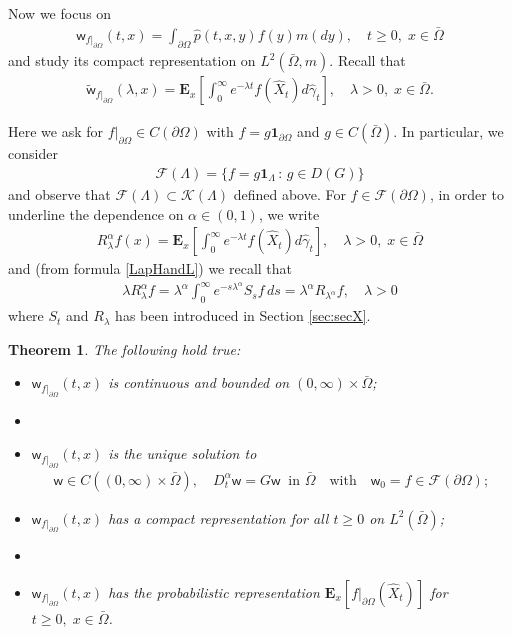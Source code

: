 \documentclass[11pt,a4paper]{article}
\newtheorem{theorem}{Theorem}[section]
\begin{document}
Now we focus on 
\begin{align*}
\mathsf{w}_{f|_{\partial \Omega}}(t, x) = \int_{\partial \Omega} \hat{p}(t,x,y) f(y) m(dy), \quad t\geq 0,\; x \in \bar{\Omega}
\end{align*}
and study its compact representation on $L^2(\bar{\Omega}, m)$. Recall that 
\begin{align*}
\tilde{\mathsf{w}}_{f|_{\partial \Omega}}(\lambda, x) = \mathbf{E}_x\left[\int_0^\infty e^{-\lambda t} f(\hat{X}_t) d\hat{\gamma}_t \right], \quad \lambda > 0, \; x \in \bar{\Omega}.
\end{align*}


Here we ask for $f|_{\partial \Omega} \in C(\partial \Omega)$ with $f=g\mathbf{1}_{\partial \Omega}$ and $g \in C(\bar{\Omega})$. In particular, we consider
\begin{align*}
\mathcal{F}(\Lambda) = \{f = g \mathbf{1}_{\Lambda}\, :\,  g \in D(G)\}
\end{align*} 
and observe that $\mathcal{F}(\Lambda) \subset \mathcal{K}(\Lambda)$ defined above. For $f \in \mathcal{F}(\partial \Omega)$, in order to underline the dependence on $\alpha \in (0,1)$, we write
\begin{align*}
R^\alpha_\lambda f(x) = \mathbf{E}_x\left[\int_0^\infty e^{-\lambda t} f(\hat{X}_t) d\hat{\gamma}_t \right], \quad \lambda>0,\; x \in \bar{\Omega}
\end{align*}
and (from formula \eqref{LapHandL}) we recall that
\begin{align*}
\lambda R^\alpha_\lambda f = \lambda^\alpha \int_0^\infty e^{- s \lambda^\alpha} S_s f\, ds = \lambda^\alpha R_{\lambda^\alpha} f, \quad \lambda >0
\end{align*}
where $S_t$ and $R_\lambda$ has been introduced in Section \ref{sec:secX}.


\begin{theorem}
\label{lemmaWrond}
The following hold true:
\begin{itemize}
\item[i)] $\mathsf{w}_{f|_{\partial \Omega}}(t,x)$ is continuous and bounded on $(0, \infty) \times \bar{\Omega}$;
\item[]
\item[ii)] $\mathsf{w}_{f|_{\partial \Omega}}(t,x)$ is the unique solution to 
\begin{align}
\label{probFracOmega}
\mathsf{w} \in C((0,\infty) \times \bar{\Omega}),  \quad D^\alpha_t \mathsf{w} = G \mathsf{w} \;\; \textrm{in } \bar{\Omega} \quad \textrm{with} \quad \mathsf{w}_0 = f \in \mathcal{F}(\partial \Omega);
\end{align}
\item[iii)] $\mathsf{w}_{f|_{\partial \Omega}}(t,x)$ has a compact representation for all $t\geq 0$ on $L^2(\bar{\Omega})$; 
\item[]
\item[iv)] $\mathsf{w}_{f|_{\partial \Omega}}(t,x)$ has the probabilistic representation $\mathbf{E}_x[f|_{\partial \Omega}(\hat{X}_t)]$ for $t\geq 0, \; x \in \bar{\Omega}$.
\end{itemize}
\end{theorem}
\end{document}
